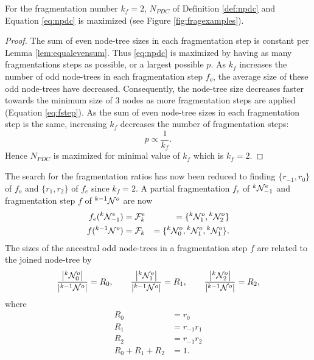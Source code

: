 \begin{theorem}\label{the:fragnumber}
  For the fragmentation number $k_f=2$, $N_{PDC}$ of Definition \ref{def:npdc} and Equation \eqref{eq:npdc} is maximized (see Figure \ref{fig:fragexamples}). 
\end{theorem}
\begin{proof}
  The sum of even node-tree sizes in each fragmentation step is constant per Lemma \ref{lem:equalevensum}. Thus \eqref{eq:npdc} is maximized by having as many fragmentations steps as possible, or a largest possible $p$.  As $k_f$ increases the number of odd node-trees in each fragmentation step $f_o$, the average size of these odd node-trees have decreased. Consequently, the node-tree size decreases faster towards the minimum size of 3 nodes as more fragmentation steps are applied (Equation \eqref{eq:fstep}). As the sum of even node-tree sizes in each fragmentation step is the same, increasing $k_f$ decreases the number of fragmentation steps: 
  \begin{equation}
    p \propto \frac{1}{k_f}.
  \end{equation}
   Hence $N_{PDC}$ is maximized for minimal value of $k_f$ which is $k_f = 2$.
\end{proof}



The search for the fragmentation ratios has now been reduced to finding $\{r_{-1}, r_0\}$ of $f_o$ and $\{r_1, r_2\}$ of $f_e$ since $k_f = 2$. A partial fragmentation $f_e$ of ${}^{k}\mathcal{N}^e_{-1}$ and fragmentation step $f$ of ${}^{k-1}\mathcal{N}^o$ are now
\begin{eqnarray}
  f_e({}^{k}\mathcal{N}^e_{-1})  &= \mathcal{F}^e_k  &=\{{}^{k}\mathcal{N}^{o}_1,{}^{k}\mathcal{N}^o_2\} \label{eq:newpfe}\\
  f({}^{k-1}\mathcal{N}^o)       &= \mathcal{F}_k    &= \{{}^{k}\mathcal{N}^o_0, {}^{k}\mathcal{N}^o_1, {}^{k}\mathcal{N}^o_1\}. \label{eq:newfstep}
\end{eqnarray}
The sizes of the ancestral odd node-trees in a fragmentation step $f$ are related to the joined node-tree by
\begin{equation}
  \frac{\abs{{}^{k}\mathcal{N}^o_0}}{\abs{{}^{k-1}\mathcal{N}^o}} = R_0, \hspace{2em}
  \frac{\abs{{}^{k}\mathcal{N}^o_1}}{\abs{{}^{k-1}\mathcal{N}^o}} = R_1, \hspace{2em}
  \frac{\abs{{}^{k}\mathcal{N}^o_2}}{\abs{{}^{k-1}\mathcal{N}^o}} = R_2,
\end{equation}
where
\begin{align}
  \nonumber R_0 &= r_0\\
            R_1 &= r_{-1}r_1\\
  \nonumber R_2 &= r_{-1}r_2\\
  R_0 + R_1 + R_2 &= 1. \label{eq:bigratios}
\end{align}

